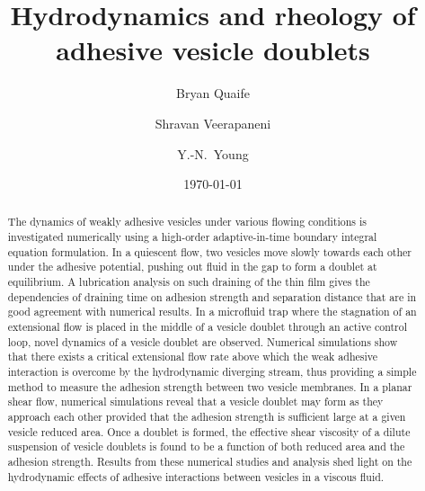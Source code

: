 \documentclass[prf,superscriptaddress,showpacs]{revtex4-1}
\begin{document}

\title{Hydrodynamics and rheology of adhesive vesicle doublets}

\author{Bryan Quaife}
\author{Shravan Veerapaneni}%
%
\author{Y.-N.~Young}%
%

\date{\today}%

\begin{abstract}

The dynamics of weakly adhesive vesicles under various flowing
conditions is investigated numerically using a high-order
adaptive-in-time boundary integral equation formulation. In a quiescent
flow, two vesicles move slowly towards each other under the adhesive
potential, pushing out fluid in the gap to form a doublet at
equilibrium. A lubrication analysis on such draining of the thin film
gives the dependencies of draining time on adhesion strength and
separation distance that are in good agreement with numerical results.
%
In a microfluid trap where the stagnation of an extensional flow is
placed in the middle of a vesicle doublet through an active control
loop, novel dynamics of a vesicle doublet are observed. Numerical
simulations show that there exists a critical extensional flow rate
above which the weak adhesive interaction is overcome by the
hydrodynamic diverging stream, thus providing a simple method to measure
the adhesion strength between two vesicle membranes. 
%
In a planar shear flow, numerical simulations reveal that a vesicle
doublet may form as they approach each other provided that the adhesion
strength is sufficient large at a given vesicle reduced area. Once a
doublet is formed, the effective shear viscosity of a dilute suspension
of vesicle doublets is found to be a function of both reduced area and
the adhesion strength.  Results from these numerical studies and
analysis shed light on the hydrodynamic effects of adhesive interactions
between vesicles in a viscous fluid.
\end{abstract}
\end{document}
